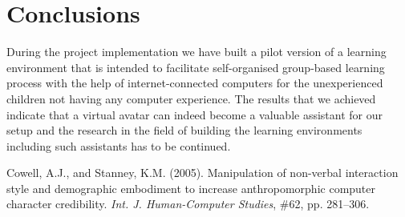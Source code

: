 \documentclass[a4paper]{article}
\begin{document}
\section{Conclusions}

During the project implementation we have built a pilot version of a learning environment that is intended to facilitate self-organised group-based learning process with the help of internet-connected computers for the unexperienced children not having any computer experience. The results that we achieved indicate that a virtual avatar can indeed become a valuable assistant for our setup and the research in the field of building the learning environments including such assistants has to be continued.


\begin{thebibliography}{99}
 Cowell, A.J., and Stanney, K.M. (2005). Manipulation of non-verbal interaction style and demographic embodiment to increase anthropomorphic computer character credibility. \emph{Int. J. Human-Computer Studies}, \#62,  pp. 281--306.
\end{thebibliography}
\end{document}
